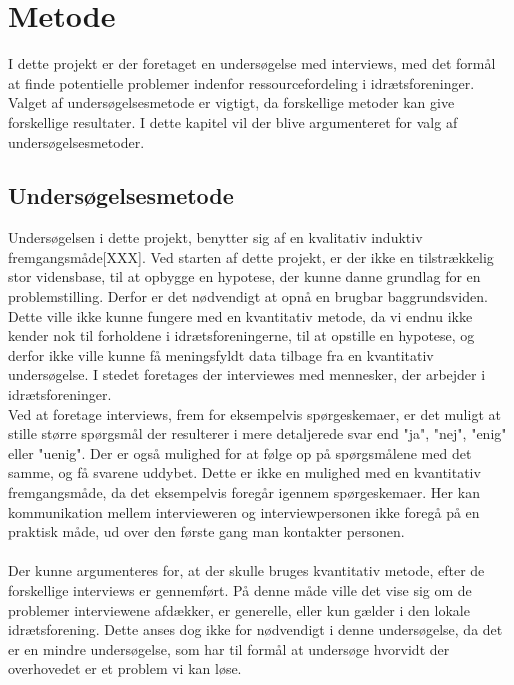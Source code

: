 \chapter{Metode}\label{ch:ch2label}
I dette projekt er der foretaget en undersøgelse med interviews, med det formål at finde potentielle problemer indenfor ressourcefordeling i idrætsforeninger. Valget af undersøgelsesmetode er vigtigt, da forskellige metoder kan give forskellige resultater. I dette kapitel vil der blive argumenteret for valg af undersøgelsesmetoder.


\section{Undersøgelsesmetode}
Undersøgelsen i dette projekt, benytter sig af en kvalitativ induktiv fremgangsmåde[XXX]. Ved starten af dette projekt, er der ikke en tilstrækkelig stor vidensbase, til at opbygge en hypotese, der kunne danne grundlag for en problemstilling. Derfor er det nødvendigt at opnå en brugbar baggrundsviden. Dette ville ikke kunne fungere med en kvantitativ metode, da vi endnu ikke kender nok til forholdene i idrætsforeningerne, til at opstille en hypotese, og derfor ikke ville kunne få meningsfyldt data tilbage fra en kvantitativ undersøgelse. I stedet foretages der interviewes med mennesker, der arbejder i idrætsforeninger.
\\
Ved at foretage interviews, frem for eksempelvis spørgeskemaer, er det muligt at stille større spørgsmål der resulterer i mere detaljerede svar end "ja", "nej", "enig" eller "uenig". Der er også mulighed for at følge op på spørgsmålene med det samme, og få svarene uddybet. Dette er ikke en mulighed med en kvantitativ fremgangsmåde, da det eksempelvis foregår igennem spørgeskemaer. Her kan kommunikation mellem intervieweren og interviewpersonen ikke foregå på en praktisk måde, ud over den første gang man kontakter personen. \citep{kvale2015}
\\
\\
Der kunne argumenteres for, at der skulle bruges kvantitativ metode, efter de forskellige interviews er gennemført. På denne måde ville det vise sig om de problemer interviewene afdækker, er generelle, eller kun gælder i den lokale idrætsforening. Dette anses dog ikke for nødvendigt i denne undersøgelse, da det er en mindre undersøgelse, som har til formål at undersøge hvorvidt der overhovedet er et problem vi kan løse.
\\
